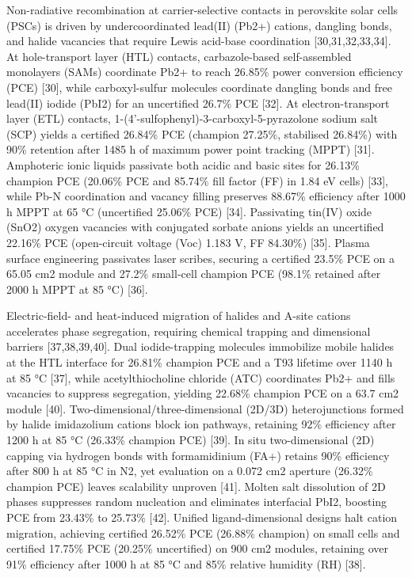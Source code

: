 \documentclass[
  11pt,
]{article}
\begin{document}
Non-radiative recombination at carrier-selective contacts in perovskite
solar cells (PSCs) is driven by undercoordinated lead(II) (Pb2+)
cations, dangling bonds, and halide vacancies that require Lewis
acid-base coordination {[}30,31,32,33,34{]}. At hole-transport layer
(HTL) contacts, carbazole-based self-assembled monolayers (SAMs)
coordinate Pb2+ to reach 26.85\% power conversion efficiency (PCE)
{[}30{]}, while carboxyl-sulfur molecules coordinate dangling bonds and
free lead(II) iodide (PbI2) for an uncertified 26.7\% PCE {[}32{]}. At
electron-transport layer (ETL) contacts,
1-(4'-sulfophenyl)-3-carboxyl-5-pyrazolone sodium salt (SCP) yields a
certified 26.84\% PCE (champion 27.25\%, stabilised 26.84\%) with 90\%
retention after 1485 h of maximum power point tracking (MPPT) {[}31{]}.
Amphoteric ionic liquids passivate both acidic and basic sites for
26.13\% champion PCE (20.06\% PCE and 85.74\% fill factor (FF) in 1.84
eV cells) {[}33{]}, while Pb-N coordination and vacancy filling
preserves 88.67\% efficiency after 1000 h MPPT at 65 °C (uncertified
25.06\% PCE) {[}34{]}. Passivating tin(IV) oxide (SnO2) oxygen vacancies
with conjugated sorbate anions yields an uncertified 22.16\% PCE
(open-circuit voltage (Voc) 1.183 V, FF 84.30\%) {[}35{]}. Plasma
surface engineering passivates laser scribes, securing a certified
23.5\% PCE on a 65.05 cm2 module and 27.2\% small-cell champion PCE
(98.1\% retained after 2000 h MPPT at 85 °C) {[}36{]}.

Electric-field- and heat-induced migration of halides and A-site cations
accelerates phase segregation, requiring chemical trapping and
dimensional barriers {[}37,38,39,40{]}. Dual iodide-trapping molecules
immobilize mobile halides at the HTL interface for 26.81\% champion PCE
and a T93 lifetime over 1140 h at 85 °C {[}37{]}, while
acetylthiocholine chloride (ATC) coordinates Pb2+ and fills vacancies to
suppress segregation, yielding 22.68\% champion PCE on a 63.7 cm2 module
{[}40{]}. Two-dimensional/three-dimensional (2D/3D) heterojunctions
formed by halide imidazolium cations block ion pathways, retaining 92\%
efficiency after 1200 h at 85 °C (26.33\% champion PCE) {[}39{]}. In
situ two-dimensional (2D) capping via hydrogen bonds with formamidinium
(FA+) retains 90\% efficiency after 800 h at 85 °C in N2, yet evaluation
on a 0.072 cm2 aperture (26.32\% champion PCE) leaves scalability
unproven {[}41{]}. Molten salt dissolution of 2D phases suppresses
random nucleation and eliminates interfacial PbI2, boosting PCE from
23.43\% to 25.73\% {[}42{]}. Unified ligand-dimensional designs halt
cation migration, achieving certified 26.52\% PCE (26.88\% champion) on
small cells and certified 17.75\% PCE (20.25\% uncertified) on 900 cm2
modules, retaining over 91\% efficiency after 1000 h at 85 °C and 85\%
relative humidity (RH) {[}38{]}.
\end{document}
